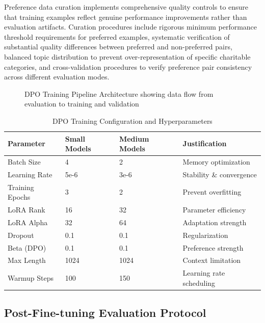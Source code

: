 Preference data curation implements comprehensive quality controls to ensure that training examples reflect genuine performance improvements rather than evaluation artifacts. Curation procedures include rigorous minimum performance threshold requirements for preferred examples, systematic verification of substantial quality differences between preferred and non-preferred pairs, balanced topic distribution to prevent over-representation of specific charitable categories, and cross-validation procedures to verify preference pair consistency across different evaluation modes.

\begin{figure}[htbp]
    \centering
    \caption{DPO Training Pipeline Architecture showing data flow from evaluation to training and validation}
    \label{fig:dpo-pipeline}
\end{figure}

\begin{table}[htbp]
    \centering
    \caption{DPO Training Configuration and Hyperparameters}
    \label{tab:dpo-configuration}
    \begin{tabular}{|l|l|l|l|}
    \hline
    \textbf{Parameter} & \textbf{Small Models} & \textbf{Medium Models} & \textbf{Justification} \\
    \hline
    Batch Size & 4 & 2 & Memory optimization \\
    Learning Rate & 5e-6 & 3e-6 & Stability \& convergence \\
    Training Epochs & 3 & 2 & Prevent overfitting \\
    LoRA Rank & 16 & 32 & Parameter efficiency \\
    LoRA Alpha & 32 & 64 & Adaptation strength \\
    Dropout & 0.1 & 0.1 & Regularization \\
    Beta (DPO) & 0.1 & 0.1 & Preference strength \\
    Max Length & 1024 & 1024 & Context limitation \\
    Warmup Steps & 100 & 150 & Learning rate scheduling \\
    \hline
    \end{tabular}
\end{table}

\subsection{Post-Fine-tuning Evaluation Protocol}

